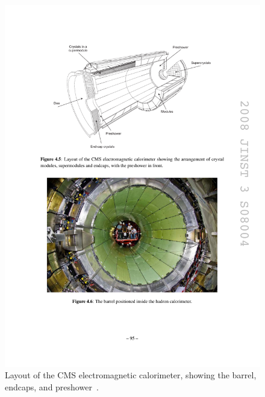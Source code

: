 \begin{figure}[hbtp]
  \begin{center}
    \includegraphics[width=1.5\cmsFigWidth]{figures/cms-ecallayout}
    \caption{Layout of the CMS electromagnetic calorimeter, showing the barrel, endcaps, and preshower~\cite{1748-0221-3-08-S08004}.}
    \label{fig:cms-ecallayout}
  \end{center}
\end{figure}


